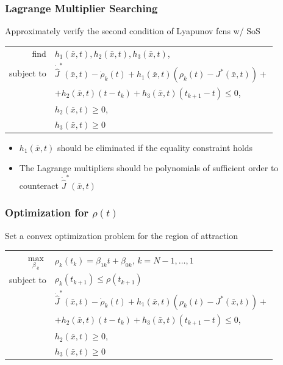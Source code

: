 \documentclass{beamer}
\begin{document}

\begin{frame}
\frametitle{Lagrange Multiplier Searching}

Approximately verify the second condition of Lyapunov fcns w/ SoS
\begin{center}
\begin{tabular}{ r l }
find & $h_1(\bar{x},t), h_2(\bar{x},t), h_3(\bar{x},t)$, \\
subject to & $\dot{\hat{J}}^{\ast}(\bar{x},t)-\dot{\rho}_k(t) + h_1(\bar{x},t)(\rho_k(t) - J^{\ast}(\bar{x},t)) +$ \\
 & \hspace{1.5cm} $+h_2(\bar{x},t)(t-t_k) +h_3(\bar{x},t)(t_{k+1}-t) \leq 0$,\\
 & $h_2(\bar{x},t)\geq 0$,\\
 & $h_3(\bar{x},t)\geq 0$
\end{tabular}
\end{center}\vspace{.2cm}
\begin{itemize}
\item $h_1(\bar{x},t)$ should be eliminated if the equality constraint holds
\item The Lagrange multipliers should be polynomials of sufficient order to counteract $\dot{\hat{J}}^{\ast}(\bar{x},t)$
\end{itemize}

\end{frame}


\begin{frame}
\frametitle{Optimization for $\rho (t)$}
Set a convex optimization problem for the region of attraction 
\begin{center}
\begin{tabular}{ r l }
$\max\limits_{\beta_{\cdot k}}$ & $\rho_k(t_k)=\beta_{1k}t + \beta_{0k}$, \hspace{.3cm} $k=N-1, \hdots , 1$ \\
subject to & $\rho_k(t_{k+1}) \leq \rho(t_{k+1})$\\
 & $\dot{\hat{J}}^{\ast}(\bar{x},t)-\dot{\rho}_k(t) + h_1(\bar{x},t)(\rho_k(t) - J^{\ast}(\bar{x},t)) +$ \\
 & \hspace{1.5cm} $+h_2(\bar{x},t)(t-t_k) +h_3(\bar{x},t)(t_{k+1}-t) \leq 0$,\\
 & $h_2(\bar{x},t)\geq 0$,\\
 & $h_3(\bar{x},t)\geq 0$
\end{tabular}
\end{center}


\end{frame}
\end{document}
